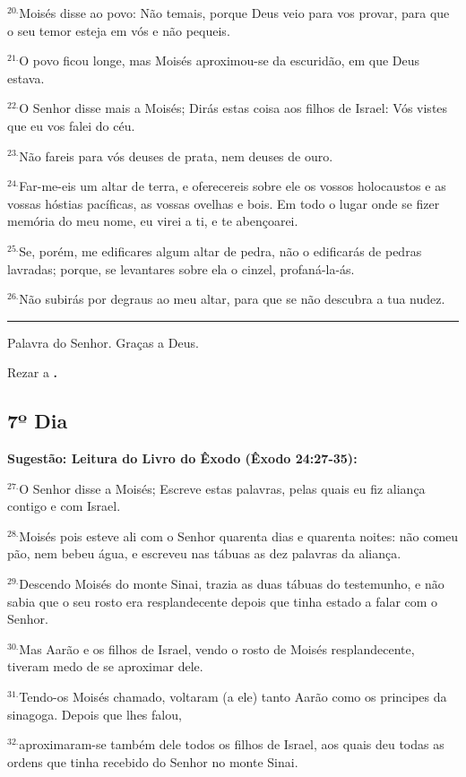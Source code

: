 \documentclass[a4paper,14pt]{extarticle} \usepackage[utf8]{inputenc}
\begin{document}
$^{20.}$Moisés disse ao povo: Não temais, porque Deus veio para vos provar, para que o seu temor esteja em vós e não pequeis.

$^{21.}$O povo ficou longe, mas Moisés aproximou-se da escuridão, em que Deus estava.

$^{22.}$O Senhor disse mais a Moisés; Dirás estas coisa aos filhos de Israel: Vós vistes que eu vos falei do céu.

$^{23.}$Não fareis para vós deuses de prata, nem deuses de ouro.

$^{24.}$Far-me-eis um altar de terra, e oferecereis sobre ele os vossos holocaustos e as vossas hóstias pacíficas, as vossas ovelhas e bois. Em todo o lugar onde se fizer memória do meu nome, eu virei a ti, e te abençoarei.

$^{25.}$Se, porém, me edificares algum altar de pedra, não o edificarás de pedras lavradas; porque, se levantares sobre ela o cinzel, profaná-la-ás.

$^{26.}$Não subirás por degraus ao meu altar, para que se não descubra a tua nudez.


\par\noindent\rule{\textwidth}{0.4pt}

Palavra do Senhor. Graças a Deus.

Rezar a \textbf{.}
\subsection{7º Dia}
\textbf{Sugestão: Leitura do Livro do Êxodo (Êxodo 24:27-35):}

$^{27.}$O Senhor disse a Moisés; Escreve estas palavras, pelas quais eu fiz aliança contigo e com Israel.

$^{28.}$Moisés pois esteve ali com o Senhor quarenta dias e quarenta noites: não comeu pão, nem bebeu água, e escreveu nas tábuas as dez palavras da aliança.

$^{29.}$Descendo Moisés do monte Sinai, trazia as duas tábuas do testemunho, e não sabia que o seu rosto era resplandecente depois que tinha estado a falar com o Senhor.

$^{30.}$Mas Aarão e os filhos de Israel, vendo o rosto de Moisés resplandecente, tiveram medo de se aproximar dele.

$^{31.}$Tendo-os Moisés chamado, voltaram (a ele) tanto Aarão como os principes da sinagoga. Depois que lhes falou,

$^{32.}$aproximaram-se também dele todos os filhos de Israel, aos quais deu todas as ordens que tinha recebido do Senhor no monte Sinai.
\end{document}
